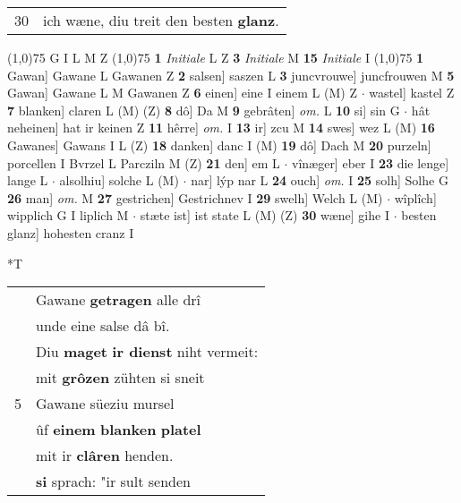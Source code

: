 \documentclass[8pt,a4paper,notitlepage]{article}
\begin{document}
\begin{table}[ht]
\begin{minipage}[t]{0.5\linewidth}
\begin{tabular}{rl}
30 & ich wæne, diu treit den besten \textbf{glanz}.\\ 
\end{tabular}
\scriptsize
\line(1,0){75} \newline
G I L M Z \newline
\line(1,0){75} \newline
\textbf{1} \textit{Initiale} L Z  \textbf{3} \textit{Initiale} M  \textbf{15} \textit{Initiale} I  \newline
\line(1,0){75} \newline
\textbf{1} Gawan] Gawane L Gawanen Z \textbf{2} salsen] saszen L \textbf{3} juncvrouwe] juncfrouwen M \textbf{5} Gawan] Gawane L M Gawanen Z \textbf{6} einen] eine I einem L (M) Z  $\cdot$ wastel] kastel Z \textbf{7} blanken] claren L (M) (Z) \textbf{8} dô] Da M \textbf{9} gebrâten] \textit{om.} L \textbf{10} si] sin G  $\cdot$ hât neheinen] hat ir keinen Z \textbf{11} hêrre] \textit{om.} I \textbf{13} ir] zcu M \textbf{14} swes] wez L (M) \textbf{16} Gawanes] Gawans I L (Z) \textbf{18} danken] danc I (M) \textbf{19} dô] Dach M \textbf{20} purzeln] porcellen I Bvrzel L Parcziln M (Z) \textbf{21} den] em L  $\cdot$ vînæger] eber I \textbf{23} die lenge] lange L  $\cdot$ alsolhiu] solche L (M)  $\cdot$ nar] lýp nar L \textbf{24} ouch] \textit{om.} I \textbf{25} solh] Solhe G \textbf{26} man] \textit{om.} M \textbf{27} gestrichen] Gestrichnev I \textbf{29} swelh] Welch L (M)  $\cdot$ wîplîch] wipplich G I liplich M  $\cdot$ stæte ist] ist state L (M) (Z) \textbf{30} wæne] gihe I  $\cdot$ besten glanz] hohesten cranz I \newline
\end{minipage}
\hspace{0.5cm}
\begin{minipage}[t]{0.5\linewidth}
\small
\begin{center}*T
\end{center}
\begin{tabular}{rl}
 & Gawane \textbf{getragen} alle drî\\ 
 & unde eine salse dâ bî.\\ 
 & Diu \textbf{maget} \textbf{ir dienst} niht vermeit:\\ 
 & mit \textbf{grôzen} zühten si sneit\\ 
5 & Gawane süeziu mursel\\ 
 & ûf \textbf{einem} \textbf{blanken} \textbf{platel}\\ 
 & mit ir \textbf{clâren} henden.\\ 
 & \textbf{si} sprach: "ir sult senden\\ 

\end{tabular}
\end{minipage}
\end{table}
\end{document}
